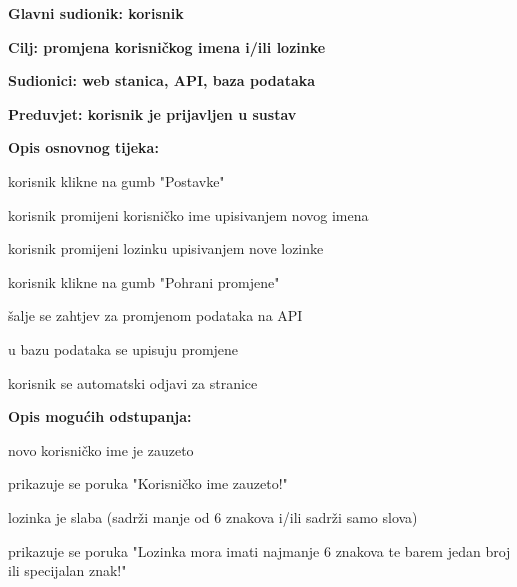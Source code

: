 				
					\noindent {}
					\begin{packed_item}
						\item \textbf{Glavni sudionik: korisnik}
						\item  \textbf{Cilj: promjena korisničkog imena i/ili lozinke}
						\item  \textbf{Sudionici: web stanica, API, baza podataka}
						\item  \textbf{Preduvjet: korisnik je prijavljen u sustav}
						
						\item  \textbf{Opis osnovnog tijeka:}
						\item[] \begin{packed_enum}
							\item korisnik klikne na gumb "Postavke"
							\item[2.a] korisnik promijeni korisničko ime upisivanjem novog imena
							\item[2.b] korisnik promijeni lozinku upisivanjem nove lozinke 
							\item[3.] korisnik klikne na gumb "Pohrani promjene"
							\item[4.] šalje se zahtjev za promjenom podataka na API
							\item[5.] u bazu podataka se upisuju promjene
							\item[6.] korisnik se automatski odjavi za stranice
						\end{packed_enum}
						
						\item  \textbf{Opis mogućih odstupanja:}
						\item[] \begin{packed_item}
							\item[3.a] novo korisničko ime je zauzeto
							\begin{packed_enum}
								\item prikazuje se poruka "Korisničko ime zauzeto!"
							\end{packed_enum}
							\item[3.b] lozinka je slaba (sadrži manje od 6 znakova i/ili sadrži samo slova)
							\begin{packed_enum}
								\item prikazuje se poruka "Lozinka mora imati najmanje 6 znakova te barem jedan broj ili specijalan znak!"
							\end{packed_enum}
						\end{packed_item}
					\end{packed_item}
				
